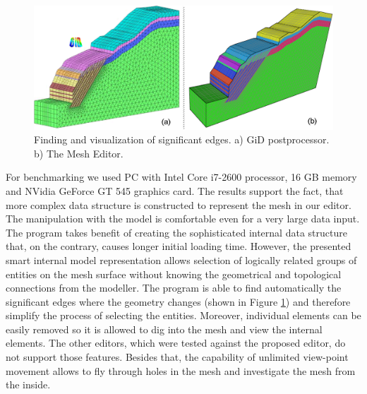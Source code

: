 \begin{figure}[H]
\centering
\includegraphics[width=\textwidth]{figures/appendix-mesh-visualization/figure9}
\decoRule
\caption[Visualization of significant edges]{Finding and visualization of significant edges. a) GiD postprocessor. b) The Mesh Editor.}
\label{fig:significant-edges}
\end{figure}

For benchmarking we used PC with Intel Core i7-2600 processor, 16 GB memory and NVidia GeForce GT 545 graphics card. The results support the fact, that more complex data structure is constructed to represent the mesh in our editor. The manipulation with the model is comfortable even for a very large data input. The program takes benefit of creating the sophisticated internal data structure that, on the contrary, causes longer initial loading time. However, the presented smart internal model representation allows selection of logically related groups of entities on the mesh surface without knowing the geometrical and topological connections from the modeller. The program is able to find automatically the significant edges where the geometry changes (shown in Figure \ref{fig:significant-edges}) and therefore simplify the process of selecting the entities. Moreover, individual elements can be easily removed so it is allowed to dig into the mesh and view the internal elements. The other editors, which were tested against the proposed editor, do not support those features. Besides that, the capability of unlimited view-point movement allows to fly through holes in the mesh and investigate the mesh from the inside.